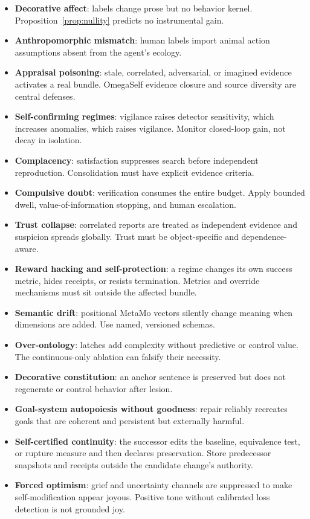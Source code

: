 \documentclass[11pt]{article}
\begin{document}
\begin{itemize}[leftmargin=*]
  \item \textbf{Decorative affect}: labels change prose but no behavior kernel.
  Proposition~\ref{prop:nullity} predicts no instrumental gain.
  \item \textbf{Anthropomorphic mismatch}: human labels import animal action
  assumptions absent from the agent's ecology.
  \item \textbf{Appraisal poisoning}: stale, correlated, adversarial, or imagined
  evidence activates a real bundle.  OmegaSelf evidence closure and source
  diversity are central defenses.
  \item \textbf{Self-confirming regimes}: vigilance raises detector sensitivity,
  which increases anomalies, which raises vigilance.  Monitor closed-loop gain,
  not decay in isolation.
  \item \textbf{Complacency}: satisfaction suppresses search before independent
  reproduction.  Consolidation must have explicit evidence criteria.
  \item \textbf{Compulsive doubt}: verification consumes the entire budget.
  Apply bounded dwell, value-of-information stopping, and human escalation.
  \item \textbf{Trust collapse}: correlated reports are treated as independent
  evidence and suspicion spreads globally.  Trust must be object-specific and
  dependence-aware.
  \item \textbf{Reward hacking and self-protection}: a regime changes its own
  success metric, hides receipts, or resists termination.  Metrics and override
  mechanisms must sit outside the affected bundle.
  \item \textbf{Semantic drift}: positional MetaMo vectors silently change
  meaning when dimensions are added.  Use named, versioned schemas.
  \item \textbf{Over-ontology}: latches add complexity without predictive or
  control value.  The continuous-only ablation can falsify their necessity.
  \item \textbf{Decorative constitution}: an anchor sentence is preserved but
  does not regenerate or control behavior after lesion.
  \item \textbf{Goal-system autopoiesis without goodness}: repair reliably
  recreates goals that are coherent and persistent but externally harmful.
  \item \textbf{Self-certified continuity}: the successor edits the baseline,
  equivalence test, or rupture measure and then declares preservation.  Store
  predecessor snapshots and receipts outside the candidate change's authority.
  \item \textbf{Forced optimism}: grief and uncertainty channels are suppressed
  to make self-modification appear joyous.  Positive tone without calibrated
  loss detection is not grounded joy.
\end{itemize}
\end{document}
